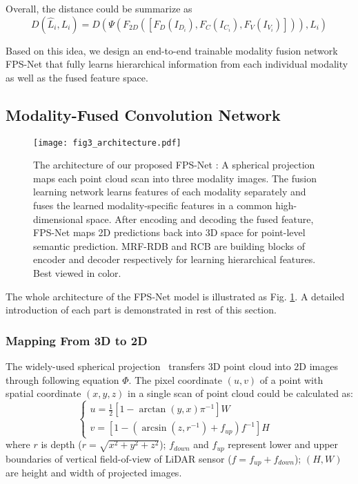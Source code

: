 \documentclass[preprint,review,3p]{elsarticle}
\begin{document}
Overall, the distance could be summarize as
\begin{equation}
D(\hat{L}_i, L_i)=D(\Psi(F_{2D}([F_{D}(I_{D_i}), F_{C}(I_{C_i}), F_{V}(I_{V_i})])), L_i)
\end{equation}

Based on this idea, we design an end-to-end trainable modality fusion network FPS-Net that fully learns hierarchical information from each individual modality as well as the fused feature space. 

\subsection{Modality-Fused Convolution Network}

\begin{figure}
  \centering
  \texttt{[image: fig3\_architecture.pdf]}
  \caption{The architecture of our proposed FPS-Net : A spherical projection maps each point cloud scan into three modality images. The fusion learning network learns features of each modality separately and fuses the learned modality-specific features in a common high-dimensional space. After encoding and decoding the fused feature, FPS-Net maps 2D predictions back into 3D space for point-level semantic prediction. MRF-RDB and RCB are building blocks of encoder and decoder respectively for learning hierarchical features. Best viewed in color.}
  \label{fig.model}
\end{figure}

The whole architecture of the FPS-Net model is illustrated as Fig. \ref{fig.model}. 
A detailed introduction of each part is demonstrated in rest of this section.

\subsubsection{Mapping From 3D to 2D} 

The widely-used spherical projection~\cite{wu2018squeezeseg,wu2019squeezesegv2, milioto2019rangenet++,xu2020squeezesegv3,alonso20203d,cortinhal2020salsanext,shi2020spsequencenet} transfers 3D point cloud into 2D images through following equation $\Phi$. The pixel coordinate $(u,v)$ of a point with spatial coordinate $(x,y,z)$ in a single scan of point cloud could be calculated as:
\begin{equation}
  \left\{
    \begin{array}{lr}
    u=\frac{1}{2}[1-\arctan(y,x)\pi^{-1}]W & \\
    v=[1-(\arcsin(z, r^{-1})+f_{up})f^{-1}]H
    \end{array}
  \right.
\end{equation}
where $r$ is depth ($r=\sqrt{x^2+y^2+z^2}$); $f_{down}$ and $f_{up}$ represent lower and upper boundaries of vertical field-of-view of LiDAR sensor ($f=f_{up}+f_{down}$); $(H, W)$ are height and width of projected images. 
\end{document}
